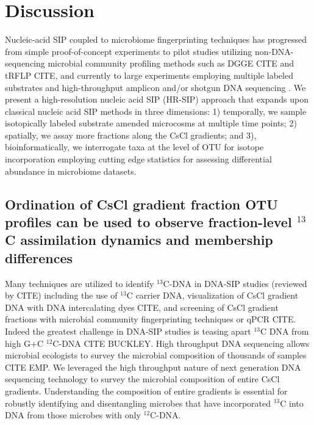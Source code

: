 \section{Discussion}
Nucleic-acid SIP coupled to microbiome fingerprinting techniques has progressed
from simple proof-of-concept experiments \citep{radajewski2000stable} 
to pilot studies utilizing non-DNA-sequencing microbial community profiling
methods such as DGGE CITE and tRFLP CITE, and currently to large experiments
employing multiple labeled substrates and high-throughput amplicon and/or
shotgun DNA sequencing \citep{Verastegui_2014}. We present a high-resolution
nucleic acid SIP (HR-SIP) approach that expands upon classical nucleic acid SIP
methods in three dimensions: 1) temporally, we sample isotopically labeled
substrate amended microcosms at multiple time points; 2) spatially, we assay
more fractions along the CsCl gradients; and 3), bioinformatically, we
interrogate taxa at the level of OTU for isotope incorporation employing
cutting edge statistics for assessing differential abundance in microbiome
datasets.

\subsection{Ordination of CsCl gradient fraction OTU profiles can be used to
observe fraction-level $^{13}$C assimilation dynamics and membership differences}
Many techniques are utilized to identify $^{13}$C-DNA in DNA-SIP studies
(reviewed by CITE) including the use of $^{13}$C carrier DNA, visualization of
CsCl gradient DNA with DNA intercalating dyes CITE, and screening of CsCl
gradient fractions with microbial community fingerprinting techniques or qPCR
CITE. Indeed the greatest challenge in DNA-SIP studies is teasing apart $^{13}$C
DNA from high G+C $^{12}$C-DNA CITE BUCKLEY. High throughput DNA sequencing
allows microbial ecologists to survey the microbial composition of thousands of
samples CITE EMP. We leveraged the high throughput nature of next generation
DNA sequencing technology to survey the microbial composition of entire CsCl
gradients.  Understanding the composition of entire gradients is essential for
robustly identifying and disentangling microbes that have incorporated $^{13}$C
into DNA from those microbes with only $^{12}$C-DNA.

